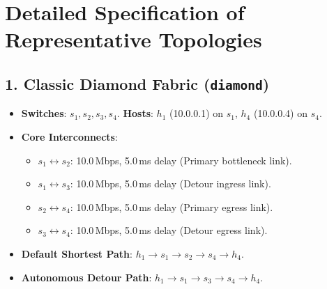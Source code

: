 \section{Detailed Specification of Representative Topologies}

\subsection{1. Classic Diamond Fabric (\texttt{diamond})}
\begin{itemize}
  \item \textbf{Switches}: $s_1, s_2, s_3, s_4$. \textbf{Hosts}: $h_1$ (10.0.0.1) on $s_1$, $h_4$ (10.0.0.4) on $s_4$.
  \item \textbf{Core Interconnects}:
    \begin{itemize}
      \item $s_1 \leftrightarrow s_2$: 10.0\,Mbps, 5.0\,ms delay (Primary bottleneck link).
      \item $s_1 \leftrightarrow s_3$: 10.0\,Mbps, 5.0\,ms delay (Detour ingress link).
      \item $s_2 \leftrightarrow s_4$: 10.0\,Mbps, 5.0\,ms delay (Primary egress link).
      \item $s_3 \leftrightarrow s_4$: 10.0\,Mbps, 5.0\,ms delay (Detour egress link).
    \end{itemize}
  \item \textbf{Default Shortest Path}: $h_1 \to s_1 \to s_2 \to s_4 \to h_4$.
  \item \textbf{Autonomous Detour Path}: $h_1 \to s_1 \to s_3 \to s_4 \to h_4$.
\end{itemize}

